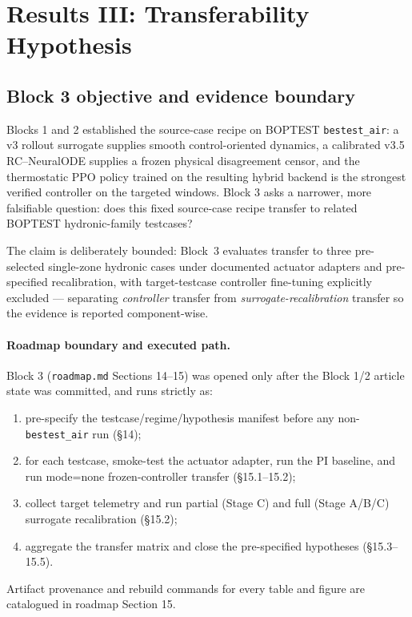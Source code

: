 \documentclass[11pt,a4paper]{article}
\begin{document}
\setcounter{section}{5}
\section{Results III: Transferability Hypothesis}
\label{sec:results3-transfer}

\subsection{Block 3 objective and evidence boundary}

Blocks 1 and 2 established the source-case recipe on BOPTEST \texttt{bestest\_air}: a v3 rollout surrogate supplies smooth control-oriented dynamics, a calibrated v3.5 RC--NeuralODE supplies a frozen physical disagreement censor, and the thermostatic PPO policy trained on the resulting hybrid backend is the strongest verified controller on the targeted windows. Block 3 asks a narrower, more falsifiable question: does this fixed source-case recipe transfer to related BOPTEST hydronic-family testcases?

The claim is deliberately bounded: Block~3 evaluates transfer to three pre-selected single-zone hydronic cases under documented actuator adapters and pre-specified recalibration, with target-testcase controller fine-tuning explicitly excluded --- separating \emph{controller} transfer from \emph{surrogate-recalibration} transfer so the evidence is reported component-wise.

\paragraph{Roadmap boundary and executed path.}
Block 3 (\texttt{roadmap.md} Sections 14--15) was opened only after the Block 1/2 article state was committed, and runs strictly as:
\begin{enumerate}
  \item pre-specify the testcase/regime/hypothesis manifest before any non-\texttt{bestest\_air} run (\S14);
  \item for each testcase, smoke-test the actuator adapter, run the PI baseline, and run mode=none frozen-controller transfer (\S15.1--15.2);
  \item collect target telemetry and run partial (Stage C) and full (Stage A/B/C) surrogate recalibration (\S15.2);
  \item aggregate the transfer matrix and close the pre-specified hypotheses (\S15.3--15.5).
\end{enumerate}
Artifact provenance and rebuild commands for every table and figure are catalogued in roadmap Section 15.
\end{document}
